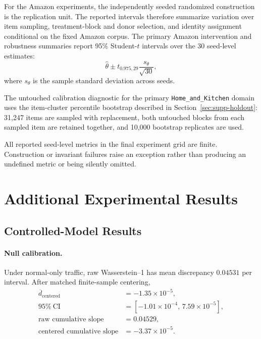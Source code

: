 For the Amazon experiments, the independently seeded randomized construction
is the replication unit. The reported intervals therefore summarize variation
over item sampling, treatment-block and donor selection, and identity
assignment conditional on the fixed Amazon corpus. The primary Amazon
intervention and robustness summaries report 95\% Student-$t$ intervals over
the 30 seed-level estimates:
\[
\widehat{\theta}
\pm
t_{0.975,29}\frac{s_\theta}{\sqrt{30}},
\]
where $s_\theta$ is the sample standard deviation across seeds.

The untouched calibration diagnostic for the primary
\texttt{Home\_and\_Kitchen} domain uses the item-cluster percentile
bootstrap described in Section~\ref{sec:supp-holdout}: 31,247 items are
sampled with replacement, both untouched blocks from each sampled item are
retained together, and 10,000 bootstrap replicates are used.

All reported seed-level metrics in the final experiment grid are finite.
Construction or invariant failures raise an exception rather than producing an
undefined metric or being silently omitted.



\section{Additional Experimental Results}
\label{sec:supp-extra-results}

\subsection{Controlled-Model Results}
\label{sec:supp-extra-controlled}

\paragraph{Null calibration.}
Under normal-only traffic, raw Wasserstein--1 has mean discrepancy $0.04531$
per interval. After matched finite-sample centering,
\[
\begin{aligned}
\overline d_{\mathrm{centered}}
&=
-1.35\times10^{-5},\\
95\%~\mathrm{CI}
&=
[-1.01\times10^{-4},\,7.59\times10^{-5}],\\
\text{raw cumulative slope}
&=
0.04529,\\
\text{centered cumulative slope}
&=
-3.37\times10^{-5}.
\end{aligned}
\]

